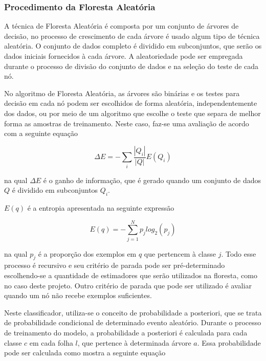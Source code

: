 \subsubsection{Procedimento da Floresta Aleatória}

A técnica de Floresta Aleatória é composta por um conjunto de árvores de decisão, no processo de crescimento de cada árvore é usado algum tipo de técnica aleatória. O conjunto de dados completo é dividido em subconjuntos, que serão os dados iniciais fornecidos à cada árvore. A aleatoriedade pode ser empregada durante o processo de divisão do conjunto de dados e na seleção do teste de cada nó.

No algoritmo de Floresta Aleatória, as árvores são binárias e os testes para decisão em cada nó podem ser escolhidos de forma aleatória, independentemente dos dados, ou por meio de um algoritmo que escolhe o teste que separa de melhor forma as amostras de treinamento. Neste caso, faz-se uma avaliação de acordo com a seguinte equação

\begin{equation}
\label{eq:randomF}
 \Delta E =
 - \displaystyle\sum_{i}\frac{|Q_i|}{|Q|}E(Q_i)
\end{equation}

na qual $\Delta E$ é o ganho de informação, que é gerado quando um conjunto de dados $Q$ é dividido em subconjuntos $Q_i$.

$E(q)$ é a entropia apresentada na seguinte expressão

\begin{equation}
\label{eq:entropy}
 E(q) = - \displaystyle\sum_{j=1}^{N}p_jlog_2(p_j)
\end{equation}

na qual $p_j$ é a proporção dos exemplos em $q$ que pertencem à classe $j$. Todo esse processo é recursivo e seu critério de parada pode ser pré-determinado escolhendo-se a quantidade de estimadores que serão utilizados na floresta, como no caso deste projeto. Outro critério de parada que pode ser utilizado é avaliar quando um nó não recebe exemplos suficientes.

Neste classificador, utiliza-se o conceito de probabilidade a posteriori, que se trata de probabilidade condicional de determinado evento aleatório. Durante o processo de treinamento do modelo, a probabilidade a posteriori é calculada para cada classe $c$ em cada folha $l$, que pertence à determinada árvore $a$. Essa probabilidade pode ser calculada como mostra a seguinte equação

